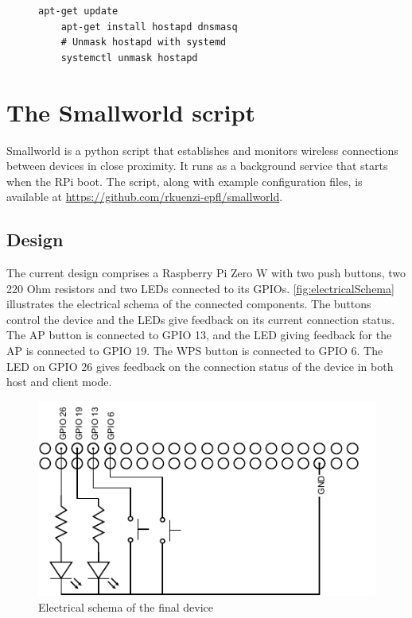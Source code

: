\documentclass[a4paper,11pt,oneside]{report}
\begin{document}
\begin{figure}
\begin{lstlisting}[label=cmd:install, caption=Hostapd and dnsmasq installation]
    apt-get update
    apt-get install hostapd dnsmasq
    # Unmask hostapd with systemd
    systemctl unmask hostapd
\end{lstlisting}
\end{figure}


\section{The Smallworld script}
\label{chap:impl}

Smallworld is a python script that establishes and monitors wireless connections between devices in close proximity. It runs as a background service that starts when the RPi boot. The script, along with example configuration files, is available at \url{https://github.com/rkuenzi-epfl/smallworld}.

\subsection{Design}

The current design comprises a Raspberry Pi Zero W with two push buttons, two 220 Ohm resistors and two LEDs connected to its GPIOs. \autoref{fig:electricalSchema} illustrates the electrical schema of the connected components. The buttons control the device and the LEDs give feedback on its current connection status. The AP button is connected to GPIO 13, and the LED giving feedback for the AP is connected to GPIO 19. The WPS button is connected to GPIO 6. The LED on GPIO 26 gives feedback on the connection status of the device in both host and client mode.
\begin{figure}
  \includegraphics[width=\linewidth]{figures/electricalSchema.pdf}
  \caption{Electrical schema of the final device}
  \label{fig:electricalSchema}
\end{figure}
\end{document}

